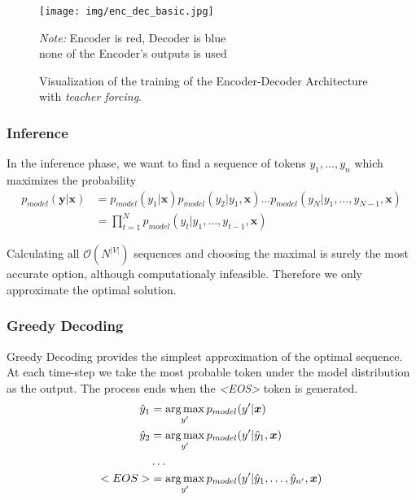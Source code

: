 \begin{figure}[!h]
    \centering
    \texttt{[image: img/enc\_dec\_basic.jpg]}

    \footnotesize{\textit{Note:} Encoder is red, Decoder is blue \\ }
    \footnotesize{none of the Encoder's outputs is used}
    \caption{\centering Visualization of the training of the Encoder-Decoder Architecture with \emph{teacher forcing}.} \label{figure:visualization_ED}
\end{figure}

\subsubsection{Inference}

In the inference phase, we want to find a sequence of tokens $y_1,\dots,y_n$ which maximizes the probability
\begin{align}
    p_{model}(\boldsymbol{y} | \boldsymbol{x}) &= p_{model}(y_1|\boldsymbol{x})p_{model}(y_2|y_1, \boldsymbol{x})\dots p_{model}(y_N|y_1,\dots,y_{N-1}, \boldsymbol{x})\\
    &= \prod_{t=1}^N{p_{model}(y_t|y_1,\dots,y_{t-1}, \boldsymbol{x})}
\end{align}

Calculating all $\mathcal{O}(N^{|V|})$ sequences and choosing the maximal is surely the most accurate option, although computationaly infeasible. Therefore we only approximate the optimal solution.

\subsubsection{Greedy Decoding} \label{subsubsection:greedy_decoding}

Greedy Decoding provides the simplest approximation of the optimal sequence. At each time-step we take the most probable token under the model distribution as the output. The process ends when the \emph{\textless EOS\textgreater} token is generated.
\begin{align*}
    \hat{y}_1 &= \operatorname*{arg\,max}_{y'}{p_{model}(y' | \boldsymbol{x})} \\
    \hat{y}_2 &= \operatorname*{arg\,max}_{y'}{p_{model}(y' | \hat{y}_1, \boldsymbol{x})} \\
    &\dots \\
    <EOS> &= \operatorname*{arg\,max}_{y'}{p_{model}(y' | \hat{y}_1,\dots,\hat{y}_{n'}, \boldsymbol{x})}
\end{align*}

